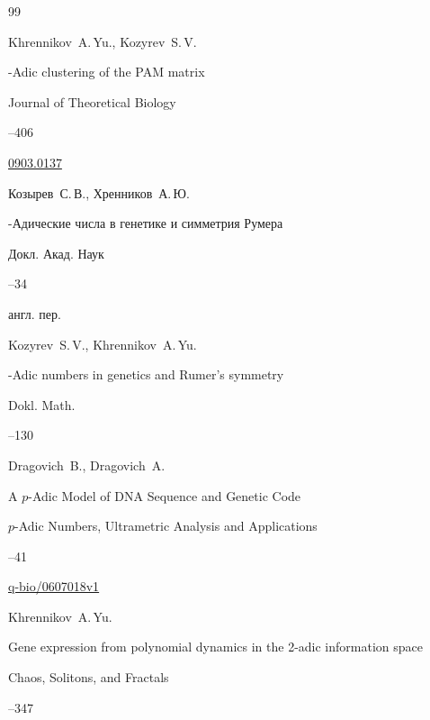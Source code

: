 \begin{thebibliography}{99}

\by  Khrennikov~A.\,Yu.,  Kozyrev~S.\,V.

-Adic clustering of the PAM matrix

\jour Journal of Theoretical Biology



–406

\arxiv \href{http://arxiv.org/abs/0903.0137}{0903.0137} 






\by  Козырев~С.\,В.,  Хренников~А.\,Ю.

-Адические числа в генетике и симметрия Румера

\jour Докл. Акад. Наук




–34

\transl англ. пер.~

\by Kozyrev~S.\,V., Khrennikov~A.\,Yu.

-Adic numbers in genetics and Rumer's symmetry

\jour Dokl. Math.



--130 





\by Dragovich~B., Dragovich~A.

\paper A $p$-Adic Model of DNA Sequence and Genetic Code

\jour $p$-Adic Numbers, Ultrametric Analysis and Applications




--41

\arxiv \href{http://arxiv.org/abs/q-bio/0607018}{q-bio/0607018v1} 






\by Khrennikov~A.\,Yu. 

\paper Gene expression from polynomial dynamics in the 2-adic information space

\jour Chaos, Solitons, and Fractals




–347





\end{thebibliography}





